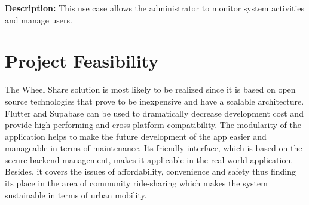 \noindent
\textbf{Description:} This use case allows the administrator to monitor system activities and manage users.


\section{Project Feasibility}
The Wheel Share solution is most likely to be realized since it is based on open source technologies that prove to be inexpensive and have a scalable architecture. Flutter and Supabase can be used to dramatically decrease development cost and provide high-performing and cross-platform compatibility. The modularity of the application helps to make the future development of the app easier and manageable in terms of maintenance. Its friendly interface, which is based on the secure backend management, makes it applicable in the real world application. Besides, it covers the issues of affordability, convenience and safety thus finding its place in the area of community ride-sharing which makes the system sustainable in terms of urban mobility. 

